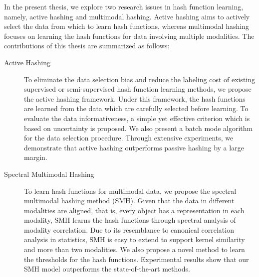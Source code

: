 In the present thesis, we explore two research issues in hash function learning, namely, active hashing and multimodal hashing. Active hashing aims to actively select the data from which to learn hash functions, whereas multimodal hashing focuses on learning the hash functions for data involving multiple modalities. The contributions of this thesis are summarized as follows:
\begin{description}
\item[Active Hashing] To eliminate the data selection bias and reduce the labeling cost of existing supervised or semi-supervised hash function learning methods, we propose the active hashing framework. Under this framework, the hash functions are learned from the data which are carefully selected before learning. To evaluate the data informativeness, a simple yet effective criterion which is based on uncertainty is proposed. We also present a batch mode algorithm for the data selection procedure. Through extensive experiments, we demonstrate that active hashing outperforms passive hashing by a large margin.

\item[Spectral Multimodal Hashing] To learn hash functions for multimodal data, we propose the spectral multimodal hashing method (\mbox{SMH}). Given that the data in different modalities are aligned, that is, every object has a representation in each modality, \mbox{SMH} learns the hash functions through spectral analysis of modality correlation. Due to its resemblance to canonical correlation analysis in statistics, SMH is easy to extend to support kernel similarity and more than two modalities. We also propose a novel method to learn the thresholds for the hash functions. Experimental results show that our \mbox{SMH} model outperforms the state-of-the-art methods. %


\end{description}

